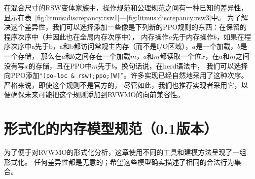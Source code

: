 在混合尺寸的RSW变体家族中，操作规范和公理规范之间有一种已知的差异性，显示在表~\ref{fig:litmus:discrepancy:rsw1}—\ref{fig:litmus:discrepancy:rsw3}中。
为了解决这个差异性，我们可以选择添加一些像是下列新的PPO规则的东西：在保留的程序次序中（并因此也在全局内存次序中），
内存操作$a$先于内存操作$b$，如果在程序次序中a先于b，a和b都访问常规主内存（而不是I/O区域），$a$是一个加载，$b$是一个存储，
那么在$a$和$b$之间存在一个加载$m$，$a$和$m$都读取一个位$x$，在$a$和$m$之间没有写$x$的存储，且在PPO中$m$先于$b$。换句话说，在{\sf herd}语法中，
我们可以选择向PPO添加“{\tt (po-loc \& rsw);ppo;[W]}”。许多实现已经自然地采用了这种次序。严格来说，即使这个规则不是官方的，
尽管如此，我们也推荐实现者采用它，以便确保未来可能把这个规则添加到RVWMO的向前兼容性。


\chapter{形式化的内存模型规范（0.1版本）}
为了便于对RVWMO的形式化分析，这章使用不同的工具和建模方法呈现了一组形式化。
任何差异性都是无意的；希望这些模型确实描述了相同的合法行为集合。


